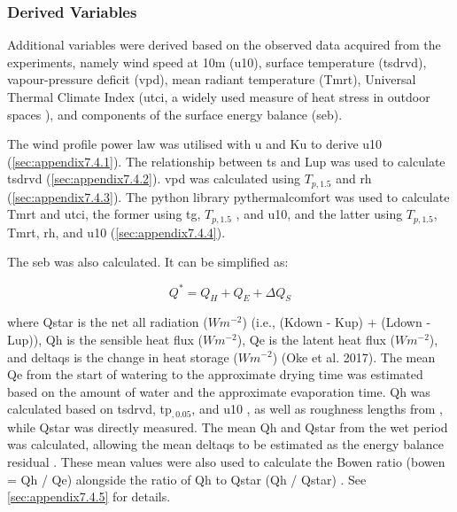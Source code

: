 \documentclass[final,3p,times,authoryear]{elsarticle}
\begin{document}
\subsubsection{Derived Variables}\label{sec:methods2.2.2}

Additional variables were derived based on the observed data acquired from the
experiments, namely wind speed at 10m (\gls{u10}), surface temperature (\gls{tsdrvd}), vapour-pressure deficit (\gls{vpd}), mean radiant temperature (\gls{Tmrt}), Universal Thermal Climate Index (\gls{utci}, a widely used measure of heat stress in outdoor spaces \citep{Zare2018a}), and components of the surface energy balance (\gls{seb}).

The wind profile power law \citep{Manwell2010,Banuelos-Ruedas2010} was
utilised with \gls{u} and \gls{Ku}  to derive \gls{u10} (\ref{sec:appendix7.4.1}). The relationship between \gls{ts} and \gls{Lup} \citep{Oke2017} was used to calculate \gls{tsdrvd} (\ref{sec:appendix7.4.2}). \gls{vpd} was calculated using $T_{p,1.5}$ and \gls{rh} \citep{Allen1998,McMahon2013} (\ref{sec:appendix7.4.3}). The python library pythermalcomfort \citep{Tartarini2020} was used to calculate \gls{Tmrt} and \gls{utci}, the former using \gls{tg}, $T_{p,1.5}$ , and \gls{u10}, and the latter using $T_{p,1.5}$, \gls{Tmrt}, \gls{rh}, and \gls{u10} (\ref{sec:appendix7.4.4}).

The \gls{seb} was also calculated. It can be simplified as:

\begin{equation}
Q^{*} = Q_{H} + Q_{E} + \Delta Q_{S}
\label{eq:2.1} 
\end{equation}

where \gls{Qstar} is the net all radiation ($Wm^{-2}$) (i.e., (\gls{Kdown} - \gls{Kup}) + (\gls{Ldown} - \gls{Lup})), \gls{Qh} is the sensible heat flux ($Wm^{-2}$), \gls{Qe} is the latent heat flux ($Wm^{-2}$), and \gls{deltaqs} is the change in heat storage ($Wm^{-2}$) (Oke et al. 2017). The mean \gls{Qe} from the start of watering to the approximate drying time was estimated based on the amount of water and the approximate evaporation time. \gls{Qh} was calculated based on \gls{tsdrvd}, \gls{tp}$_{,0.05}$, and \gls{u10} \citep{Liu2007}, as well as roughness lengths from \cite{Kanda2007}, while \gls{Qstar} was directly measured. The mean \gls{Qh} and \gls{Qstar} from the wet period was calculated, allowing the mean \gls{deltaqs} to be estimated as the energy balance residual \citep{Oke2017}. These mean values were also used to calculate the Bowen ratio (\gls{bowen} = \gls{Qh} / \gls{Qe}) alongside the ratio of \gls{Qh} to \gls{Qstar} (\gls{Qh} / \gls{Qstar}) \citep{Oke2017}. See \ref{sec:appendix7.4.5} for details.
\end{document}
